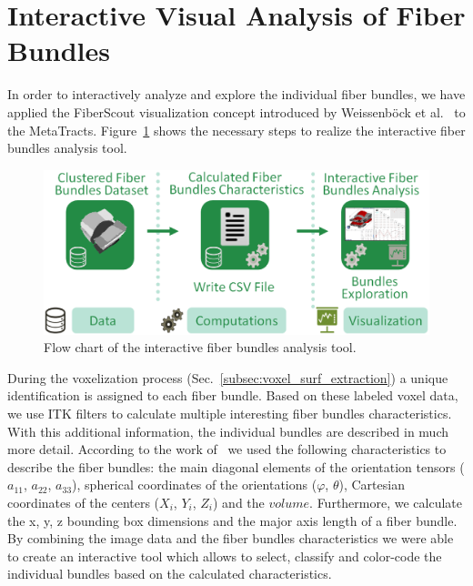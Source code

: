 \section{Interactive Visual Analysis of Fiber Bundles}
In order to interactively analyze and explore the individual fiber bundles, we have applied the FiberScout visualization concept introduced by Weissenb{\"o}ck et al.~\cite{Weissenbock2014} to the MetaTracts. Figure~\ref{fig:metatracts_fiberscout_workflow} shows the necessary steps to realize the interactive fiber bundles analysis tool.

\begin{figure}[htb]
	\centering
	\includegraphics[width=\linewidth]{images/MetaTractsToFiberScout_workflow.eps}
	\caption{Flow chart of the interactive fiber bundles analysis tool.}
	\label{fig:metatracts_fiberscout_workflow}
\end{figure}

During the voxelization process (Sec.~\ref{subsec:voxel_surf_extraction}) a unique identification is assigned to each fiber bundle. Based on these labeled voxel data, we use ITK\cite{Ibanez2005} filters to calculate multiple interesting fiber bundles characteristics. With this additional information, the individual bundles are described in much more detail. According to the work of~\cite{Weissenbock2014} we used the following characteristics to describe the fiber bundles: the main diagonal elements of the orientation tensors ($a_{11}$, $a_{22}$, $a_{33}$), spherical coordinates of the orientations ($\varphi$, $\theta$), Cartesian coordinates of the centers ($X_{i}$, $Y_{i}$, $Z_{i}$) and the $volume$. Furthermore, we calculate the x, y, z bounding box dimensions and the major axis length of a fiber bundle. By combining the image data and the fiber bundles characteristics we were able to create an interactive tool which allows to select, classify and color-code the individual bundles based on the calculated characteristics.

